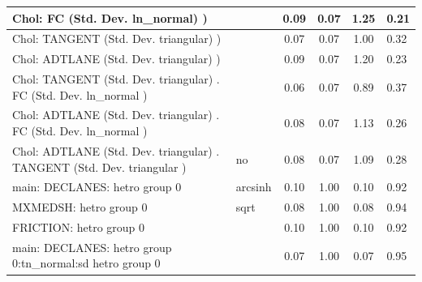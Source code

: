 \begin{table}
\begin{center}
\begin{tabular}{|l|l|c|c|c|l|}
			\hline
			 Chol: FC (Std. Dev. ln_normal) ) &  & 0.09 & 0.07 & 1.25 & 0.21 \\
			\hline
			 Chol: TANGENT (Std. Dev. triangular) ) &  & 0.07 & 0.07 & 1.00 & 0.32 \\
			\hline
			 Chol: ADTLANE (Std. Dev. triangular) ) &  & 0.09 & 0.07 & 1.20 & 0.23 \\
			\hline
			 Chol: TANGENT (Std. Dev. triangular) . FC (Std. Dev.   ln_normal ) &  & 0.06 & 0.07 & 0.89 & 0.37 \\
			\hline
			 Chol: ADTLANE (Std. Dev. triangular) . FC (Std. Dev.   ln_normal ) &  & 0.08 & 0.07 & 1.13 & 0.26 \\
			\hline
			 Chol: ADTLANE (Std. Dev. triangular) . TANGENT (Std. Dev.   triangular ) & no & 0.08 & 0.07 & 1.09 & 0.28 \\
			\hline
			main: DECLANES: hetro group 0 & arcsinh & 0.10 & 1.00 & 0.10 & 0.92 \\
			\hline
			MXMEDSH: hetro group 0 & sqrt & 0.08 & 1.00 & 0.08 & 0.94 \\
			\hline
			FRICTION: hetro group 0 &  & 0.10 & 1.00 & 0.10 & 0.92 \\
			\hline
			main: DECLANES: hetro group 0:tn_normal:sd  hetro group 0 &  & 0.07 & 1.00 & 0.07 & 0.95 \\
			\hline
		\end{tabular}
	\end{center}
\end{table}
